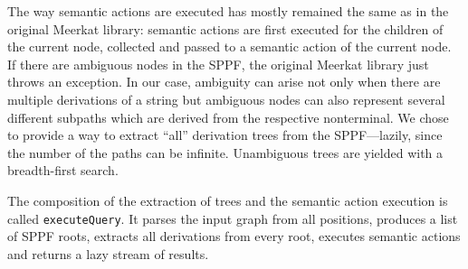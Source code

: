 


The way semantic actions are executed has mostly remained the same as in the original Meerkat library: semantic actions are first executed for the children of the current node, collected and passed to a semantic action of the current node. 
If there are ambiguous nodes in the SPPF, the original Meerkat library just throws an exception. 
In our case, ambiguity can arise not only when there are multiple derivations of a string but ambiguous nodes can also represent several different subpaths which are derived from the respective nonterminal.
We chose to provide a way to extract ``all'' derivation trees from the SPPF---lazily, since the number of the paths can be infinite. 
Unambiguous trees are yielded with a breadth-first search.




The composition of the extraction of trees and the semantic action execution is called \lstinline{executeQuery}.
It parses the input graph from all positions, produces a list of SPPF roots, extracts all derivations from every root, executes semantic actions and returns a lazy stream of results.